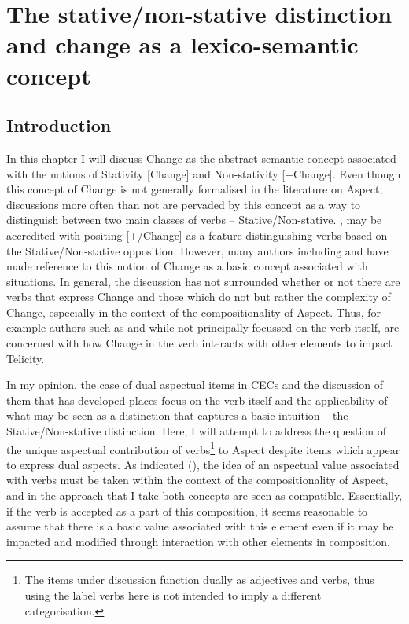 \chapter[Stative/non-stative distinction and change as a
lexico-semantic concept]{The stative/non-stative distinction and
  change as a lexico-semantic concept}\label{sec:4}\label{ch:4}

\section{Introduction}\label{sec:4.0}

In this chapter I will discuss Change as the abstract semantic concept
associated with the notions of Stativity [\textminus Change] and Non-stativity
[+Change].  Even though this concept of Change is not generally
formalised in the literature on Aspect, discussions more often than
not are pervaded by this concept as a way to distinguish between two
main classes of verbs – Stative\slash Non-stative.  \citet{Verkuyl1993,Verkuyl1999},
may be accredited with positing [+/\textminus Change] as a feature
distinguishing verbs based on the Stative\slash Non-stative opposition.
However, many authors including \citet{Vendler1967, Comrie1976, Mourelatos1981, Jackendoff1996} and
\citet{Krifka1998} have made reference to this notion of Change as a
basic concept associated with situations.  In general, the discussion
has not surrounded whether or not there are verbs that express Change
and those which do not but rather the complexity of Change, especially
in the context of the compositionality of Aspect.  Thus, for example
authors such as \textcite{Verkuyl1993, Verkuyl1999, Tenny1994, Jackendoff1996} 
and \citet{Krifka1998,Krifka2001} while not principally
focussed on the verb itself, are concerned with how Change in the verb
interacts with other elements to impact Telicity.

In my opinion, the case of dual aspectual items in CECs and the
discussion of them that has developed places focus on the verb itself
and the applicability of what may be seen as a distinction that
captures a basic intuition -- the Stative\slash Non-stative distinction.  Here,
I will attempt to address the question of the unique aspectual
contribution of verbs\footnote{The items under discussion function
  dually as adjectives and verbs, thus using the label verbs here is
  not intended to imply a different categorisation.}  to Aspect
despite items which appear to express dual aspects.  As indicated
(), the idea of an aspectual value associated with verbs
must be taken within the context of the compositionality of Aspect,
and in the approach that I take both concepts are seen as compatible.
Essentially, if the verb is accepted as a part of this composition, it
seems reasonable to assume that there is a basic value associated with
this element even if it may be impacted and modified through
interaction with other elements in composition.

